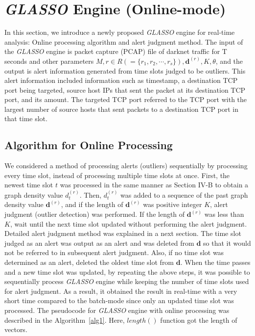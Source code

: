 \documentclass[conference]{IEEEtran}
\begin{document}
\section{{\it GLASSO} Engine (Online-mode)}
In this section, we introduce a newly proposed {\it GLASSO} engine for real-time analysis: Online processing algorithm and alert judgment method.
The input of the {\it GLASSO} engine is packet capture (PCAP) file of darknet traffic for T seconds and other parameters $M, r \in R ( = \{r_1, r_2, \cdots, r_s\} ), \bm{d}^{(r)}, K, \theta$, and the output is alert information generated from time slots judged to be outliers.
This alert information included information such as timestamp, a destination TCP port being targeted, source host IPs that sent the packet at its destination TCP port, and its amount.
The targeted TCP port referred to the TCP port with the largest number of source hosts that sent packets to a destination TCP port in that time slot.






\subsection{Algorithm for Online Processing}
We considered a method of processing alerts (outliers) sequentially by processing every time slot, instead of processing multiple time slots at once.
First, the newest time slot $t$ was processed in the same manner as Section I\hspace{-.1em}V-B to obtain a graph density value $d_t^{(r)}$.
Then, $d_t^{(r)}$ was added to a sequence of the past graph density value $\bm{d}^{(r)}$, and if the length of $\bm{d}^{(r)}$ was positive integer $K$, alert judgment (outlier detection) was performed.
If the length of $\bm{d}^{(r)}$ was less than $K$, wait until the next time slot updated without performing the alert judgment.
Detailed alert judgment method was explained in a next section.
The time slot judged as an alert was output as an alert and was deleted from $\bm{d}$ so that it would not be referred to in subsequent alert judgment.
Also, if no time slot was determined as an alert, deleted the oldest time slot from $\bm{d}$.
When the time passes and a new time slot was updated, by repeating the above steps, it was possible to sequentially process {\it GLASSO} engine while keeping the number of time slots used for alert judgment.
As a result, it obtained the result in real-time with a very short time compared to the batch-mode since only an updated time slot was processed.
The pseudocode for {\it GLASSO} engine with online processing was described in the Algorithm~\ref{alg1}.
Here, $length()$ function got the length of vectors.
\end{document}
